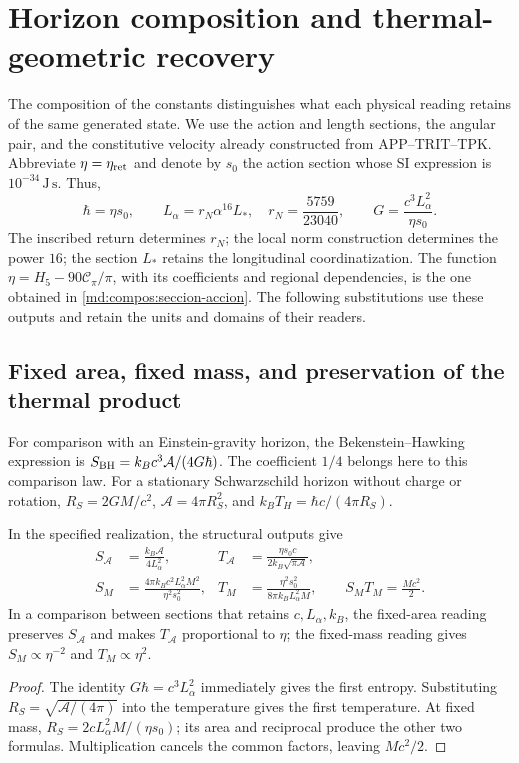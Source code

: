 \section{Horizon composition and thermal-geometric recovery}
\label{ins29:vii:horizonte}

The composition of the constants distinguishes what each physical
reading retains of the same generated state. We use the action and
length sections, the angular pair, and the constitutive velocity already
constructed from APP--TRIT--TPK. Abbreviate \(\eta=\eta_{\rm ret}\)
and denote by \(s_0\) the action section whose SI expression is
\(10^{-34}\,\mathrm{J\,s}\). Thus,
\[
 \hbar=\eta s_0,\qquad
 L_\alpha=r_N\alpha^{16}L_*,\quad r_N=\frac{5759}{23040},\qquad
 G=\frac{c^3L_\alpha^2}{\eta s_0}.
\]
The inscribed return determines \(r_N\); the local norm construction
determines the power \(16\); the section \(L_*\) retains the longitudinal
coordinatization. The function \(\eta=H_5-90\mathcal C_\pi/\pi\), with
its coefficients and regional dependencies, is the one obtained in
\eqref{md:compos:seccion-accion}. The following substitutions use these outputs
and retain the units and domains of their readers.

\subsection{Fixed area, fixed mass, and preservation of the thermal product}

For comparison with an Einstein-gravity horizon, the Bekenstein--Hawking
expression is \(S_{\rm BH}=k_Bc^3\mathcal A/(4G\hbar)\).
The coefficient \(1/4\) belongs here to this comparison law.
For a stationary Schwarzschild horizon without charge or rotation,
\(R_S=2GM/c^2\), \(\mathcal A=4\pi R_S^2\), and
\(k_BT_H=\hbar c/(4\pi R_S)\).

\begin{proposition}
\label{ins29:vii:area_masa}
In the specified realization, the structural outputs give
\begin{align*}
 S_{\mathcal A}&=\frac{k_B\mathcal A}{4L_\alpha^2},&
 T_{\mathcal A}&=\frac{\eta s_0c}{2k_B\sqrt{\pi\mathcal A}},\\
 S_M&=\frac{4\pi k_Bc^2L_\alpha^2M^2}{\eta^2s_0^2},&
 T_M&=\frac{\eta^2s_0^2}{8\pi k_BL_\alpha^2M},
 \qquad S_MT_M=\frac{Mc^2}{2}.
\end{align*}
In a comparison between sections that retains \(c,L_\alpha,k_B\),
the fixed-area reading preserves \(S_{\mathcal A}\) and makes
\(T_{\mathcal A}\) proportional to \(\eta\); the fixed-mass reading
gives \(S_M\propto\eta^{-2}\) and \(T_M\propto\eta^2\).
\end{proposition}
\begin{proof}
The identity \(G\hbar=c^3L_\alpha^2\) immediately gives the first
entropy. Substituting \(R_S=\sqrt{\mathcal A/(4\pi)}\) into the
temperature gives the first temperature. At fixed mass,
\(R_S=2cL_\alpha^2M/(\eta s_0)\); its area and reciprocal produce
the other two formulas. Multiplication cancels the common factors,
leaving \(Mc^2/2\).
\end{proof}

